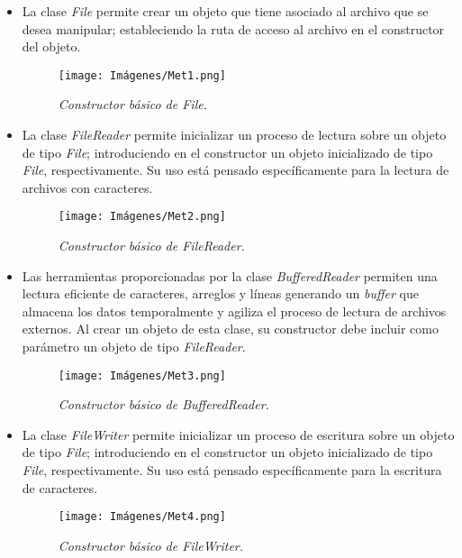 \documentclass[letterpaper,12pt]{extarticle}
\begin{document}
\begin{itemize}
\item La clase \textit{File} permite crear un objeto que tiene asociado al archivo que se desea manipular; estableciendo la ruta de acceso al archivo en el constructor del objeto. 

\begin{figure}[h!]
\centering
\texttt{[image: Imágenes/Met1.png]}
\caption{\textit{Constructor básico de File.}}
\label{fig:Met1}
\end{figure}


\item La clase \textit{FileReader} permite inicializar un proceso de lectura sobre un objeto de tipo \textit{File}; introduciendo en el constructor un objeto inicializado de tipo \textit{File}, respectivamente. Su uso está pensado específicamente para la lectura de archivos con caracteres.

\begin{figure}[h!]
\centering
\texttt{[image: Imágenes/Met2.png]}
\caption{\textit{Constructor básico de FileReader.}}
\label{fig:Met2}
\end{figure}

\item Las herramientas proporcionadas por la clase \textit{BufferedReader} permiten una lectura eficiente de caracteres, arreglos y líneas generando un \textit{buffer} que almacena los datos temporalmente y agiliza el proceso de lectura de archivos externos. Al crear un objeto de esta clase, su constructor debe incluir como parámetro un objeto de tipo \textit{FileReader}.

\begin{figure}[h!]
\centering
\texttt{[image: Imágenes/Met3.png]}
\caption{\textit{Constructor básico de BufferedReader.}}
\label{fig:Met3}
\end{figure}

\item La clase \textit{FileWriter} permite inicializar un proceso de escritura sobre un objeto de tipo \textit{File}; introduciendo en el constructor un objeto inicializado de tipo \textit{File}, respectivamente. Su uso está pensado específicamente para la escritura de caracteres.

\begin{figure}[h!]
\centering
\texttt{[image: Imágenes/Met4.png]}
\caption{\textit{Constructor básico de FileWriter.}}
\label{fig:Met4}
\end{figure}


\end{itemize}
\end{document}
